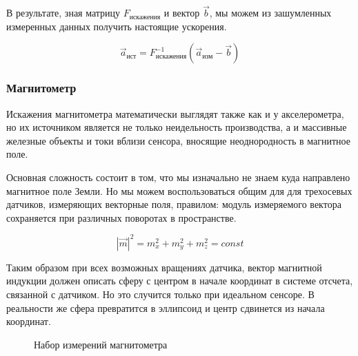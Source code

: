 \documentclass[12pt,a4paper]{article}
\begin{document}
В результате, зная матрицу $F_{\text{искажения}}$ и вектор $\vec{b}$, мы можем из зашумленных измеренных данных получить настоящие ускорения.

$$ \vec{a}_{\text{ист}} = F_{\text{искажения}}^{-1}(\vec{a}_{\text{изм}} - \vec{b})  $$

\subsubsection{Магнитометр}

Искажения магнитометра математически выглядят также как и у акселерометра, но их источником является не только неидельность производства, а и массивные железные объекты и токи вблизи сенсора, вносящие неоднородность в магнитное поле.

Основная сложность состоит в том, что мы изначально не знаем куда направлено магнитное поле Земли. Но мы можем воспользоваться общим для для трехосевых датчиков, измеряющих векторные поля, правилом: модуль измеряемого вектора сохраняется при различных поворотах в пространстве.

$$ |\vec{m}|^2 = m_x^2 + m_y^2 + m_z^2 = const $$

Таким образом при всех возможных вращениях датчика, вектор магнитной индукции должен описать сферу с центром в начале координат в системе отсчета, связанной с датчиком. Но это случится только при идеальном сенсоре. В реальности же сфера превратится в эллипсоид и центр сдвинется из начала координат.

\begin{figure}[h!]
	\caption{Набор измерений магнитометра}
	\label{fig:compass_points}
\end{figure}
\end{document}
